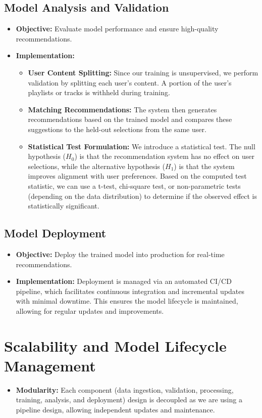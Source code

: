 \documentclass{article}
\begin{document}
\subsection{Model Analysis and Validation}
\begin{itemize}
    \item \textbf{Objective:} Evaluate model performance and ensure high-quality recommendations.
    \item \textbf{Implementation:} 
    \begin{itemize}
        \item \textbf{User Content Splitting:} Since our training is unsupervised, we perform validation by splitting each user's content. A portion of the user's playlists or tracks is withheld during training.
        \item \textbf{Matching Recommendations:} The system then generates recommendations based on the trained model and compares these suggestions to the held-out selections from the same user.
        \item \textbf{Statistical Test Formulation:} We introduce a statistical test. The null hypothesis (\( H_0 \)) is that the recommendation system has no effect on user selections, while the alternative hypothesis (\( H_1 \)) is that the system improves alignment with user preferences. Based on the computed test statistic, we can use a t-test, chi-square test, or non-parametric tests (depending on the data distribution) to determine if the observed effect is statistically significant.
    \end{itemize}
\end{itemize}

\subsection{Model Deployment}
\begin{itemize}
    \item \textbf{Objective:} Deploy the trained model into production for real-time recommendations.
    \item \textbf{Implementation:} Deployment is managed via an automated CI/CD pipeline, which facilitates continuous integration and incremental updates with minimal downtime. This ensures the model lifecycle is maintained, allowing for regular updates and improvements.
\end{itemize}

\section{Scalability and Model Lifecycle Management}
\begin{itemize}
    \item \textbf{Modularity:} Each component (data ingestion, validation, processing, training, analysis, and deployment) design is decoupled as we are using a pipeline design, allowing independent updates and maintenance.
\end{itemize}
\end{document}
